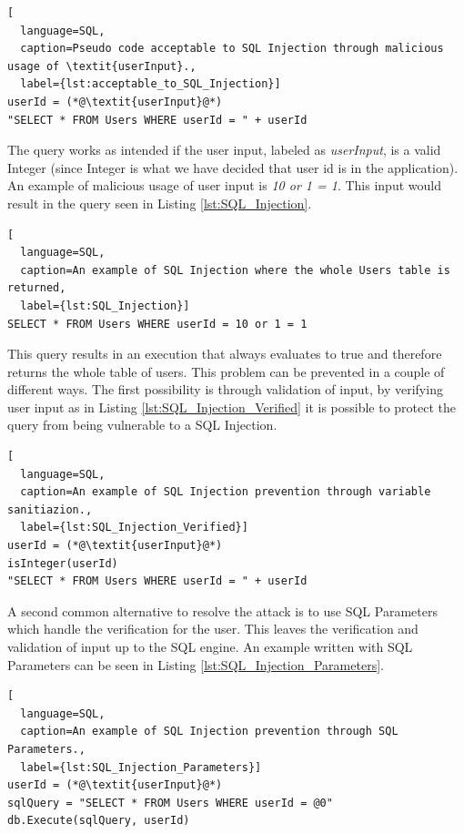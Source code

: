 \hfill
\begin{lstlisting}[
  language=SQL,
  caption=Pseudo code acceptable to SQL Injection through malicious usage of \textit{userInput}.,
  label={lst:acceptable_to_SQL_Injection}]
userId = (*@\textit{userInput}@*)
"SELECT * FROM Users WHERE userId = " + userId
\end{lstlisting}
\hfill

The query works as intended if the user input, labeled as \textit{userInput}, is a valid Integer (since Integer is what we have decided that user id is in the application). An example of malicious usage of user input is \textit{10 or 1 = 1}. This input would result in the query seen in Listing \ref{lst:SQL_Injection}.

\hfill
\begin{lstlisting}[
  language=SQL,
  caption=An example of SQL Injection where the whole Users table is returned,
  label={lst:SQL_Injection}]
SELECT * FROM Users WHERE userId = 10 or 1 = 1
\end{lstlisting}
\hfill

This query results in an execution that always evaluates to true and therefore returns the whole table of users. This problem can be prevented in a couple of different ways. The first possibility is through validation of input, by verifying user input as in Listing \ref{lst:SQL_Injection_Verified} it is possible to protect the query from being vulnerable to a SQL Injection.

\hfill
\begin{lstlisting}[
  language=SQL,
  caption=An example of SQL Injection prevention through variable sanitiazion.,
  label={lst:SQL_Injection_Verified}]
userId = (*@\textit{userInput}@*)
isInteger(userId)
"SELECT * FROM Users WHERE userId = " + userId
\end{lstlisting}
\hfill

A second common alternative to resolve the attack is to use SQL Parameters which handle the verification for the user. This leaves the verification and validation of input up to the SQL engine. An example written with SQL Parameters can be seen in Listing \ref{lst:SQL_Injection_Parameters}.

\hfill
\begin{lstlisting}[
  language=SQL,
  caption=An example of SQL Injection prevention through SQL Parameters.,
  label={lst:SQL_Injection_Parameters}]
userId = (*@\textit{userInput}@*)
sqlQuery = "SELECT * FROM Users WHERE userId = @0"
db.Execute(sqlQuery, userId)
\end{lstlisting}



